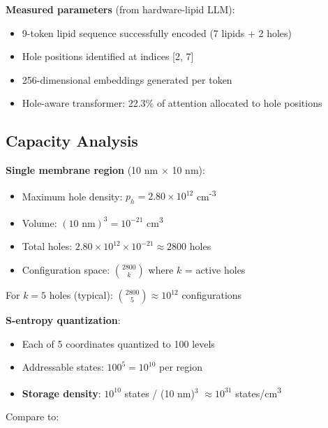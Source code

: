 \documentclass[11pt,a4paper]{article}
\begin{document}
\textbf{Measured parameters} (from hardware-lipid LLM):
\begin{itemize}
\item 9-token lipid sequence successfully encoded (7 lipids + 2 holes)
\item Hole positions identified at indices [2, 7]
\item 256-dimensional embeddings generated per token
\item Hole-aware transformer: 22.3\% of attention allocated to hole positions
\end{itemize}

\subsection{Capacity Analysis}

\textbf{Single membrane region} (10 nm × 10 nm):
\begin{itemize}
\item Maximum hole density: $p_h = 2.80\times10^{12}$ cm\textsuperscript{-3}
\item Volume: $(10 \text{ nm})^3 = 10^{-21}$ cm\textsuperscript{3}
\item Total holes: $2.80\times10^{12} \times 10^{-21} \approx 2800$ holes
\item Configuration space: $\binom{2800}{k}$ where $k$ = active holes
\end{itemize}

For $k=5$ holes (typical): $\binom{2800}{5} \approx 10^{12}$ configurations

\textbf{S-entropy quantization}:
\begin{itemize}
\item Each of 5 coordinates quantized to 100 levels
\item Addressable states: $100^5 = 10^{10}$ per region
\item \textbf{Storage density}: $10^{10}$ states / (10 nm)$^3$ $\approx 10^{31}$ states/cm\textsuperscript{3}
\end{itemize}

Compare to:
\end{document}
